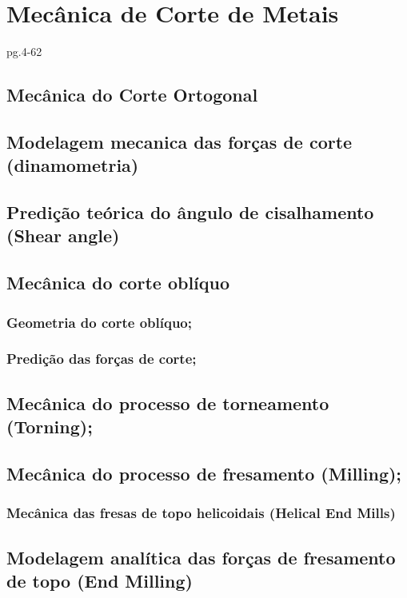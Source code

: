 \chapter{Mecânica de Corte de Metais}

pg.4-62

\section{Mecânica do Corte Ortogonal}

\section{Modelagem mecanica das forças de corte (dinamometria)}

\section{Predição teórica do ângulo de cisalhamento (Shear angle)}

\section{Mecânica do corte oblíquo}

\subsection{Geometria do corte oblíquo;}

\subsection{Predição das forças de corte; }

\section{Mecânica do processo de torneamento (Torning);}

\section{Mecânica do processo de fresamento (Milling);}

\subsection{Mecânica das fresas de topo helicoidais (Helical End Mills)}

\section{Modelagem analítica das forças de fresamento de topo (End Milling)}

